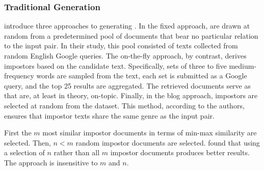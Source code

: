 \subsubsection{Traditional \Imp{} Generation}
\label{subsubsec:traditional_impostor_generation}

\citet{koppel_determining_2014} introduce three approaches to generating \imps{}. 
In the fixed approach, \imps{} are drawn at random from a predetermined pool of documents that bear no particular relation to the input pair.
In their study, this pool consisted of texts collected from random English Google queries. 
The on-the-fly approach, by contrast, derives impostors based on the candidate text. 
Specifically, sets of three to five medium-frequency words are sampled from the text, each set is submitted as a Google query, and the top 25 results are aggregated. 
The retrieved documents serve as \imps{} that are, at least in theory, on-topic. 
Finally, in the blog approach, impostors are selected at random from the \dataBlog{} dataset. 
This method, according to the authors, ensures that impostor texts share the same genre as the input pair.


First the $m$ most similar impostor documents in terms of min-max similarity are selected.
Then, $n < m$ random impostor documents are selected.
\citet{koppel_determining_2014} found that using a selection of $n$ \imps{} rather than all $m$ impostor documents produces better results.
The approach is insensitive to $m$ and $n$.